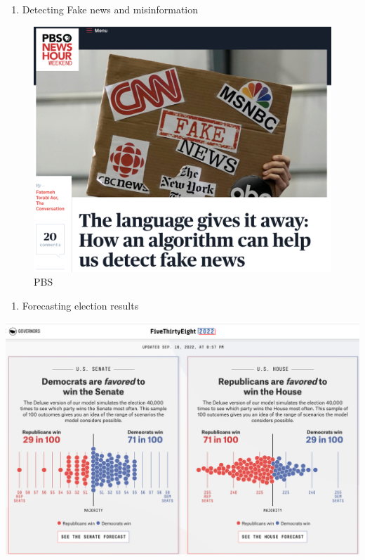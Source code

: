 \documentclass[
  letterpaper,
  DIV=11,
  numbers=noendperiod]{scrreprt}
\providecommand{\tightlist}{%
  \setlength{\itemsep}{0pt}\setlength{\parskip}{0pt}}\usepackage{longtable,booktabs,array}
\begin{document}
\begin{enumerate}
\def\labelenumi{\arabic{enumi}.}
\setcounter{enumi}{1}
\tightlist
\item
  Detecting Fake news and misinformation
\end{enumerate}

\begin{figure}

{\centering \includegraphics{images/fakenewsai.png}

}

\caption{PBS}

\end{figure}

\begin{enumerate}
\def\labelenumi{\arabic{enumi}.}
\setcounter{enumi}{2}
\tightlist
\item
  Forecasting election results
\end{enumerate}

\includegraphics{images/forecast22.png}
\end{document}
